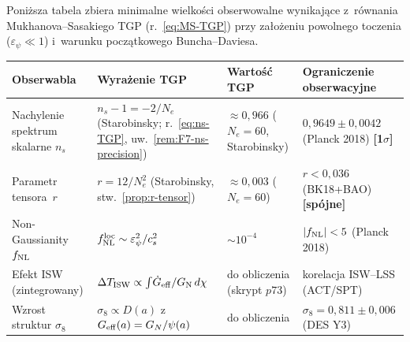 \begin{remark}%
\label{rem:min-observables}
Poni\.zsza tabela zbiera minimalne wielko\'sci obserwowalne wynikaj\k{a}ce
z~r\'ownania Mukhanova--Sasakiego TGP (r.~\eqref{eq:MS-TGP})
przy za\l{}o\.zeniu powolnego toczenia ($\varepsilon_\psi \ll 1$)
i~warunku pocz\k{a}tkowego Buncha--Daviesa.

\begin{center}\small
\begin{tabular}{@{}p{2.8cm}p{3.8cm}p{2.3cm}p{3.5cm}@{}}
\toprule
\textbf{Obserwabla} & \textbf{Wyra\.zenie TGP} & \textbf{Warto\'s\'c TGP} &
  \textbf{Ograniczenie obserwacyjne} \\
\midrule
Nachylenie spektrum skalarne $n_s$
  & $n_s{-}1 = {-}2/N_e$
    (Starobinsky;
    r.~\eqref{eq:ns-TGP},
    uw.~\ref{rem:F7-ns-precision})
  & $\approx 0{,}966$
    ($N_e=60$, Starobinsky)
  & $0{,}9649 \pm 0{,}0042$
    (Planck 2018) \textbf{[1$\sigma$]} \\[6pt]
Parametr tensora~$r$
  & $r = 12/N_e^2$
    (Starobinsky, stw.~\ref{prop:r-tensor})
  & $\approx 0{,}003$
    ($N_e=60$)
  & $r < 0{,}036$
    (BK18+BAO)
    \textbf{[sp\'ojne]} \\[6pt]
Non-Gaussianity $f_{\rm NL}$
  & $f_{\rm NL}^{\rm loc} \sim
      \varepsilon_\psi^2 / c_s^2$
  & $\sim 10^{-4}$
  & $|f_{\rm NL}| < 5$
    (Planck 2018) \\[6pt]
Efekt ISW (zintegrowany)
  & $\Delta T_{\rm ISW} \propto
      \int\!\dot{G}_{\rm eff}/G_{\rm N}\,d\chi$
  & do obliczenia
    (skrypt $p73$)
  & korelacja ISW--LSS
    (ACT/SPT) \\[6pt]
Wzrost struktur $\sigma_8$
  & $\sigma_8 \propto D(a)$
    z~$G_{\rm eff}(a) = G_N/\psi(a)$
  & do obliczenia
  & $\sigma_8 = 0{,}811
    \pm 0{,}006$
    (DES Y3) \\[6pt]
\bottomrule
\end{tabular}
\end{center}


\end{remark}
